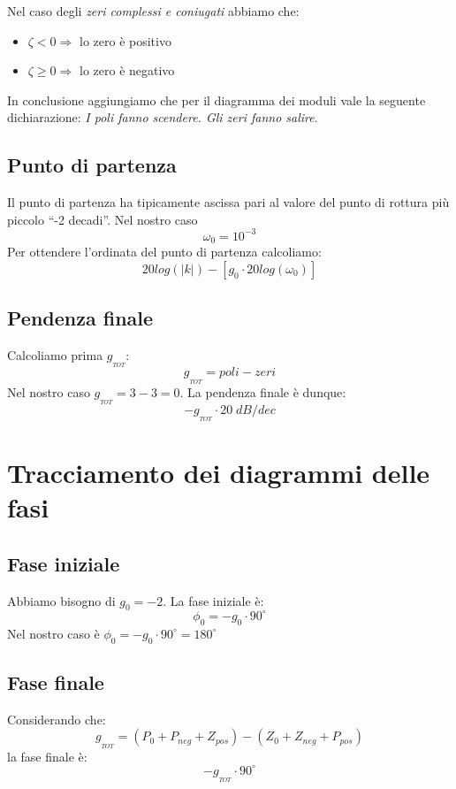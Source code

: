 \documentclass[a4paper]{report}
\begin{document}
Nel caso degli {\em zeri complessi e coniugati} abbiamo che:
\begin{itemize}
  \item $\zeta < 0 \Rightarrow$ lo zero \`e positivo
  \item $\zeta \geq 0 \Rightarrow$ lo zero \`e negativo
\end{itemize}
In conclusione aggiungiamo che per il diagramma dei moduli vale la
seguente dichiarazione: {\em I poli fanno scendere. Gli zeri fanno salire}.

\subsection{Punto di partenza}
Il punto di partenza ha tipicamente ascissa pari al valore del punto
di rottura pi\`u piccolo ``-2 decadi''. Nel nostro caso
$$\omega_0 = 10^{-3}$$
Per ottendere l'ordinata del punto di partenza calcoliamo:
\[
  20 log (|k|) - \left[ g_0 \cdot 20 log (\omega_0)\right]
\]

\subsection{Pendenza finale}
Calcoliamo prima $g_{_{TOT}}$:
\begin{equation}\label{gtotale}
  g_{_{TOT}} = poli - zeri
\end{equation}
Nel nostro caso $g_{_{TOT}} = 3 - 3 = 0$. La pendenza finale \`e
dunque:
\begin{equation}\label{pendenzafinale}
  - g_{_{TOT}} \cdot 20\;dB/dec
\end{equation}

\section{Tracciamento dei diagrammi delle fasi}
\subsection{Fase iniziale}
Abbiamo bisogno di $g_0 = -2$. La fase iniziale \`e:
\[
  \phi_0 = -g_0 \cdot 90^{\circ}
\]
Nel nostro caso \`e $\phi_0 = -g_0 \cdot 90^{\circ} = 180^{\circ}$

\subsection{Fase finale}
Considerando che:
\[
  g_{_{TOT}} = (P_0 + P_{neg} + Z_{pos}) - (Z_0 + Z_{neg} + P_{pos})
\]
la fase finale \`e:
\begin{equation}\label{fasefinale}
  -g_{_{TOT}} \cdot 90^{\circ}
\end{equation}
\end{document}
